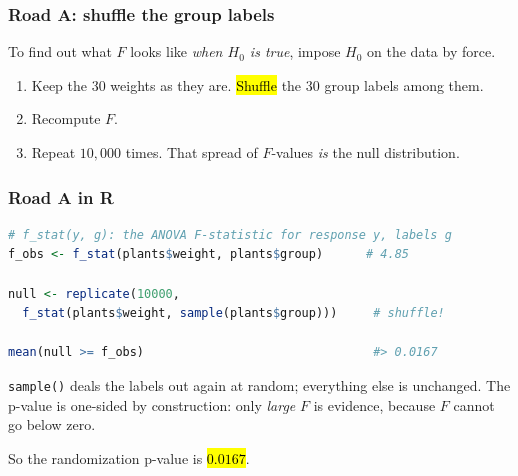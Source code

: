\documentclass[slidestop,compress,mathserif]{beamer}
\begin{document}
\begin{frame}
\frametitle{Road A: shuffle the group labels}

To find out what $F$ looks like \emph{when $H_0$ is true}, impose $H_0$ on the data by force.

\pause
{}

\pause
\vspace{-0.1em}
{\small
\begin{enumerate}
\item Keep the 30 weights as they are. \hl{Shuffle} the 30 group labels among them.
\item Recompute $F$.
\item Repeat $10{,}000$ times. That spread of $F$-values \emph{is} the null distribution.
\end{enumerate}}

\end{frame}


\begin{frame}[fragile]
\frametitle{Road A in R}

\begin{lstlisting}[language=R, basicstyle=\ttfamily\scriptsize]
# f_stat(y, g): the ANOVA F-statistic for response y, labels g
f_obs <- f_stat(plants$weight, plants$group)      # 4.85

null <- replicate(10000,
  f_stat(plants$weight, sample(plants$group)))     # shuffle!

mean(null >= f_obs)                                #> 0.0167
\end{lstlisting}

\vspace{-0.2em}
{\small \texttt{sample()} deals the labels out again at random; everything else is unchanged. The p-value is one-sided by construction: only \emph{large} $F$ is evidence, because $F$ cannot go below zero.}

\pause
\vspace{0.3em}
{\small So the randomization p-value is \hl{$0.0167$}.}

\end{frame}
\end{document}

